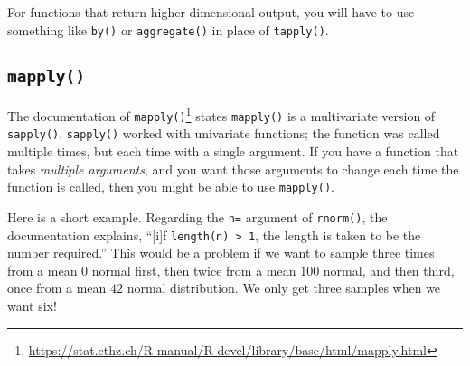 \documentclass[12pt,krantz2]{krantz}
\makeatletter
\newenvironment{Shaded}{\begin{snugshade}}{\end{snugshade}}
\newcommand{\CommentTok}[1]{\textcolor[rgb]{0.37,0.37,0.37}{\textit{#1}}}
\newcommand{\DecValTok}[1]{\textcolor[rgb]{0.06,0.06,0.06}{#1}}
\newcommand{\KeywordTok}[1]{\textcolor[rgb]{0.27,0.27,0.27}{\textbf{#1}}}
\newcommand{\NormalTok}[1]{#1}
\newcommand{\OperatorTok}[1]{\textcolor[rgb]{0.43,0.43,0.43}{\textbf{#1}}}
\newcommand{\StringTok}[1]{\textcolor[rgb]{0.5,0.5,0.5}{#1}}
\renewcommand{\href}[2]{#2\footnote{\url{#1}}}
\newenvironment{kframe}{%
\medskip{}
\setlength{\fboxsep}{.8em}
 \def\at@end@of@kframe{}%
 \ifinner\ifhmode%
  \def\at@end@of@kframe{\end{minipage}}%
  \begin{minipage}{\columnwidth}%
 \fi\fi%
 \def\FrameCommand##1{\hskip\@totalleftmargin \hskip-\fboxsep
 \colorbox{shadecolor}{##1}\hskip-\fboxsep
     \hskip-\linewidth \hskip-\@totalleftmargin \hskip\columnwidth}%
 \MakeFramed {\advance\hsize-\width
   \@totalleftmargin\z@ \linewidth\hsize
   \@setminipage}}%
 {\par\unskip\endMakeFramed%
 \at@end@of@kframe}
\renewenvironment{Shaded}{\begin{kframe}}{\end{kframe}}
\makeatother
\begin{document}
\begin{Shaded}
\end{Shaded}

\begin{rmd-details}
For functions that return higher-dimensional output, you will have to use something like \texttt{by()} or \texttt{aggregate()} in place of \texttt{tapply()}.

\end{rmd-details}

\hypertarget{mapply}{%
\subsection{\texorpdfstring{\texttt{mapply()}}{mapply()}}\label{mapply}}

The \href{https://stat.ethz.ch/R-manual/R-devel/library/base/html/mapply.html}{documentation of \texttt{mapply()}} states \texttt{mapply()} is a multivariate version of \texttt{sapply()}. \texttt{sapply()} worked with univariate functions; the function was called multiple times, but each time with a single argument. If you have a function that takes \emph{multiple arguments}, and you want those arguments to change each time the function is called, then you might be able to use \texttt{mapply()}.

Here is a short example. Regarding the \texttt{n=} argument of \texttt{rnorm()}, the documentation explains, ``{[}i{]}f \texttt{length(n)\ \textgreater{}\ 1}, the length is taken to be the number required.'' This would be a problem if we want to sample three times from a mean \(0\) normal first, then twice from a mean \(100\) normal, and then third, once from a mean \(42\) normal distribution. We only get three samples when we want six!
\end{document}
